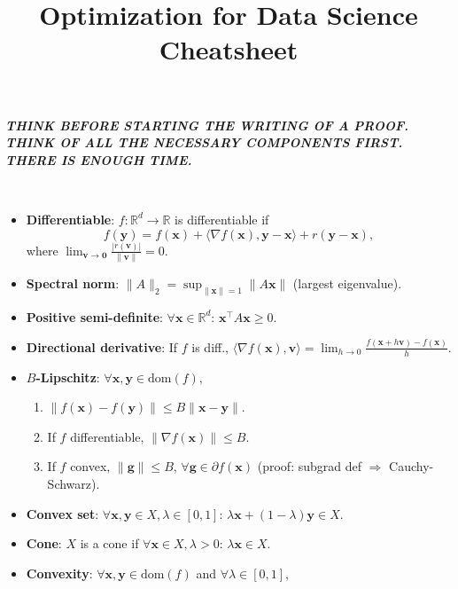 \documentclass[8pt,a4paper]{extarticle}
\title{Optimization for Data Science Cheatsheet}
\newcommand{\R}{\mathbb{R}}
\renewcommand{\vec}[1]{\bm{#1}}
\newcommand{\mat}[1]{#1}
\newcommand{\dom}[1]{\mathrm{dom}(#1)}
\newenvironment{topic}[1]
{\textbf{\sffamily \colorbox{black}{\rlap{\textbf{\textcolor{white}{#1}}}\hspace{\linewidth}\hspace{-2\fboxsep}}} \\ \vspace{0.2cm}}
{}
\begin{document}
\setlength{\columnsep}{0.2cm}

\begin{multicols*}{2}
    \textbf{\textit{THINK BEFORE STARTING THE WRITING OF A PROOF. THINK OF ALL THE NECESSARY COMPONENTS FIRST. THERE IS ENOUGH TIME.}}

    \begin{topic}{Definitions}
        \begin{itemize}
            \item \textbf{Differentiable}: $f: \R^d \to \R$ is differentiable if \[
                      f(\vec{y}) = f(\vec{x}) + \langle \nabla f(\vec{x}), \vec{y} - \vec{x} \rangle + r(\vec{y} - \vec{x}),
                  \]
                  where $\lim_{\vec{v} \to \vec{0}} \frac{| r(\vec{v}) |}{\| \vec{v} \|} = 0$.
            \item \textbf{Spectral norm}: $\| \mat{A} \|_2 = \sup_{\| \vec{x} \| = 1} \| \mat{A} \vec{x} \|$ (largest eigenvalue).
            \item \textbf{Positive semi-definite}: $\forall \vec{x} \in \R^d$: $\vec{x}^\top \mat{A} \vec{x} \geq 0$.
            \item \textbf{Directional derivative}: If $f$ is diff., $\langle \nabla f(\vec{x}), \vec{v} \rangle = \lim_{h \to 0} \frac{f(\vec{x} + h \vec{v}) - f(\vec{x})}{h}$.
            \item \textbf{$B$-Lipschitz}: $\forall \vec{x}, \vec{y} \in \dom{f},$
                  \begin{enumerate}
                      \item $\| f(\vec{x}) - f(\vec{y}) \| \leq B \| \vec{x} - \vec{y} \|$.
                      \item If $f$ differentiable, $\| \nabla f(\vec{x}) \| \leq B$.
                      \item If $f$ convex, $\| \vec{g} \| \leq B$, $\forall \vec{g} \in \partial f(\vec{x})$ (proof: subgrad
                            def $\Rightarrow$ Cauchy-Schwarz).
                  \end{enumerate}
            \item \textbf{Convex set}: $\forall \vec{x}, \vec{y} \in X, \lambda \in [0,1]$: $\lambda \vec{x} + (1-\lambda) \vec{y} \in X$.
            \item \textbf{Cone}: $X$ is a cone if $\forall \vec{x} \in X, \lambda > 0$: $\lambda \vec{x} \in X$.
            \item \textbf{Convexity}: $\forall \vec{x}, \vec{y} \in \dom{f}$ and $\forall \lambda \in [0,1]$,
                  \begin{enumerate}

\end{enumerate}
\end{itemize}
\end{topic}
\end{multicols*}
\end{document}

